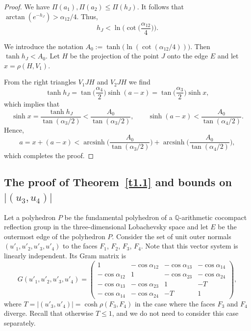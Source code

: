 \documentclass[reqno,12pt]{amsart}
\begin{document}
\begin{proof}
We have $\Pi(a_1), \Pi(a_2) \leq \Pi(h_J)$. It follows that
$\arctan(e^{-h_J}) > \alpha_{12}/4$. Thus,
$$
h_J < \ln \biggl(\cot \biggl(\frac{\alpha_{12}}{4} \biggr)\biggr).
$$

We introduce the notation $A_0 := \operatorname{tanh} \bigl(\ln(\cot({\alpha_{12}}/{4}))\bigr)$. Then
$\operatorname{tanh} h_J < A_0$. Let $H$ be the projection of the point $J$ onto the edge $E$ and let
$x=\rho(H,V_1)$.

From the right triangles $V_1 J H$ and $V_2 J H$ we find
\begin{equation}
\label{eq4}
\operatorname{tanh} h_J=\tan \biggl(\frac{\alpha_4}{2}\biggr) \sinh(a-x) =
\tan \biggl(\frac{\alpha_3}{2} \biggr) \sinh x,
\end{equation}
which implies that
$$
\sinh x=\frac{\operatorname{tanh} h_J}{\tan ({\alpha_3}/{2})} < \frac{A_0}{\tan ({\alpha_3}/{2})},
\qquad \sinh (a-x) < \frac{A_0}{\tan ({\alpha_4}/{2})}.
$$
Hence,
$$
a=x+(a-x) <\operatorname{arcsinh} \biggl(\frac{A_0}{\tan ({\alpha_3}/{2})}\biggr)
+ \operatorname{arcsinh} \biggl(\frac{A_0}{\tan ({\alpha_4}/{2})}\biggr),
$$
which completes the proof.
 \end{proof}


\subsection{The proof of Theorem~\ref{t1.1} and bounds on  $|(u_3,
u_4)|$}
\label{ss2.4}
Let a polyhedron $P$ be the fundamental polyhedron of a
$\mathbb{Q}$-arithmetic cocompact reflection group in the three-dimensional
Lobachevsky space and let $E$ be the outermost edge of the polyhedron
$P$. Consider the set of unit outer normals  $(u'_1, u'_2, u'_3,
u'_4)$ to the faces $F_1$, $F_2$, $F_3$, $F_4$. Note that this vector system is
linearly independent. Its Gram matrix is
$$
G(u'_1, u'_2, u'_3, u'_4) =
\begin{pmatrix}
1 & -\cos \alpha_{12} & -\cos \alpha_{13} & -\cos \alpha_{14}\\
-\cos \alpha_{12} & 1 & -\cos \alpha_{23} & -\cos \alpha_{24}\\
-\cos \alpha_{13} & -\cos \alpha_{23} & 1 & -T\\
-\cos \alpha_{14} & -\cos \alpha_{24} & -T & 1
\end{pmatrix},
$$
where $T=|(u'_3, u'_4)|=\cosh \rho(F_3, F_4)$ in the case where the faces $F_3$ and
$F_4$ diverge. Recall that otherwise $T \leq 1$, and we do not need to consider this case separately.
\end{document}
